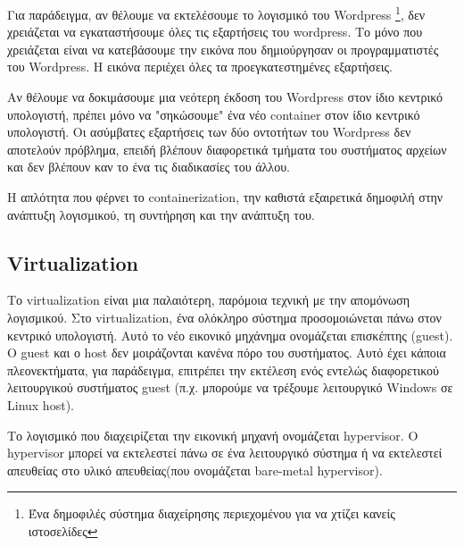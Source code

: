 Για παράδειγμα, αν θέλουμε να εκτελέσουμε το λογισμικό του
\textlatin{Wordpress} \footnote{Ένα δημοφιλές σύστημα διαχείρησης περιεχομένου
για να χτίζει κανείς ιστοσελίδες}, δεν χρειάζεται να εγκαταστήσουμε όλες τις
εξαρτήσεις του \textlatin{wordpress}. Το μόνο που χρειάζεται είναι να
κατεβάσουμε την εικόνα που δημιούργησαν οι προγραμματιστές του
\textlatin{Wordpress}. Η εικόνα περιέχει όλες τα προεγκατεστημένες εξαρτήσεις.

Αν θέλουμε να δοκιμάσουμε μια νεότερη έκδοση του \textlatin{Wordpress} στον ίδιο
κεντρικό υπολογιστή, πρέπει μόνο να "σηκώσουμε" ένα νέο \textlatin{container}
στον ίδιο κεντρικό υπολογιστή. Οι ασύμβατες εξαρτήσεις των δύο οντοτήτων του
\textlatin{Wordpress} δεν αποτελούν πρόβλημα, επειδή βλέπουν διαφορετικά
τμήματα του συστήματος αρχείων και δεν βλέπουν καν το ένα τις διαδικασίες του
άλλου.

Η απλότητα που φέρνει το \textlatin{containerization}, την  καθιστά εξαιρετικά
δημοφιλή στην ανάπτυξη λογισμικού, τη συντήρηση και την ανάπτυξη του.


\subsection{\textlatin{Virtualization}}

Το \textlatin{virtualization} είναι μια παλαιότερη, παρόμοια τεχνική με την
απομόνωση λογισμικού. Στο \textlatin{virtualization}, ένα ολόκληρο σύστημα
προσομοιώνεται πάνω στον κεντρικό υπολογιστή. Αυτό το νέο εικονικό 
μηχάνημα ονομάζεται επισκέπτης (\textlatin{guest}). Ο \textlatin{guest} και ο
\textlatin{host} δεν μοιράζονται κανένα πόρο του συστήματος. Αυτό έχει κάποια
πλεονεκτήματα, για παράδειγμα, επιτρέπει την εκτέλεση
ενός εντελώς διαφορετικού λειτουργικού συστήματος \textlatin{guest} 
(π.χ. μπορούμε να τρέξουμε λειτουργικό \textlatin{Windows} σε
\textlatin{Linux host}).

Το λογισμικό που διαχειρίζεται την εικονική μηχανή ονομάζεται \textlatin{hypervisor}.
Ο \textlatin{hypervisor} μπορεί να εκτελεστεί πάνω σε ένα λειτουργικό σύστημα ή
να εκτελεστεί απευθείας στο υλικό απευθείας(που ονομάζεται 
\textlatin{bare-metal hypervisor}).


